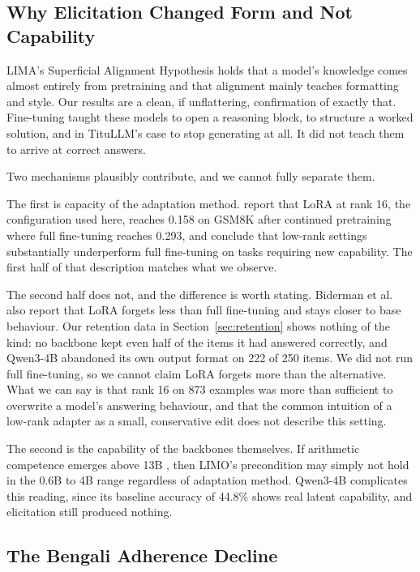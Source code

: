 \documentclass[10pt,twocolumn,letterpaper]{article}
\begin{document}
\subsection{Why Elicitation Changed Form and Not Capability}

LIMA's Superficial Alignment Hypothesis \parencite{zhou2023lima} %
holds that a model's knowledge comes almost entirely from pretraining and that
alignment mainly teaches formatting and style. Our results are a clean, if
unflattering, confirmation of exactly that. Fine-tuning taught these models to
open a reasoning block, to structure a worked solution, and in TituLLM's case to
stop generating at all. It did not teach them to arrive at correct answers.

Two mechanisms plausibly contribute, and we cannot fully separate them.

The first is capacity of the adaptation method. \textcite{biderman2024lora} %
report that LoRA at rank 16, the configuration used here, reaches 0.158 on
GSM8K after continued pretraining where full fine-tuning reaches 0.293, and
conclude that low-rank settings substantially underperform full fine-tuning on
tasks requiring new capability. The first half of that description matches what
we observe.

The second half does not, and the difference is worth stating. Biderman et al.
also report that LoRA forgets less than full fine-tuning and stays closer to
base behaviour. Our retention data in Section~\ref{sec:retention} shows nothing
of the kind: no backbone kept even half of the items it had answered correctly,
and Qwen3-4B abandoned its own output format on 222 of 250 items. We did not
run full fine-tuning, so we cannot claim LoRA forgets more than the alternative.
What we can say is that rank 16 on 873 examples was more than sufficient to
overwrite a model's answering behaviour, and that the common intuition of a
low-rank adapter as a small, conservative edit does not describe this setting.

The second is the capability of the backbones themselves. If arithmetic
competence emerges above 13B \parencite{wei2022emergent}, %
then LIMO's precondition may simply not hold in the 0.6B to 4B range regardless
of adaptation method. Qwen3-4B complicates this reading, since its baseline
accuracy of 44.8\% shows real latent capability, and elicitation still
produced nothing.

\subsection{The Bengali Adherence Decline}
\end{document}
